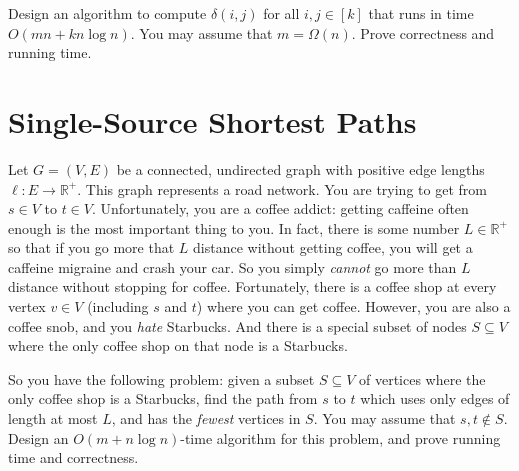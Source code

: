 \documentclass[11pt]{article}
\begin{document}
Design an algorithm to compute $\delta(i,j)$ for all $i,j \in [k]$ that runs in time $O(mn + kn\log n)$.  You may assume that $m = \Omega(n)$.  Prove correctness and running time.


\section{Single-Source Shortest Paths}
Let $G = (V, E)$ be a connected, undirected graph with positive edge lengths $\ell : E \rightarrow \mathbb{R}^+$.  This graph represents a road network.  You are trying to get from $s \in V$ to $t \in V$.  Unfortunately, you are a coffee addict: getting caffeine often enough is the most important thing to you.  In fact, there is some number $L \in \mathbb{R}^+$ so that if you go more that $L$ distance without getting coffee, you will get a caffeine migraine and crash your car.  So you simply \emph{cannot} go more than $L$ distance without stopping for coffee.  Fortunately, there is a coffee shop at every vertex $v \in V$ (including $s$ and $t$) where you can get coffee.  However, you are also a coffee snob, and you \emph{hate} Starbucks.  And there is a special subset of nodes $S \subseteq V$ where the only coffee shop on that node is a Starbucks.

So you have the following problem: given a subset $S \subseteq V$ of vertices where the only coffee shop is a Starbucks, find the path from $s$ to $t$ which uses only edges of length at most $L$, and has the \emph{fewest} vertices in $S$.  You may assume that $s,t\not\in S$.  Design an $O(m + n\log n)$-time algorithm for this problem, and prove running time and correctness.
\end{document}
